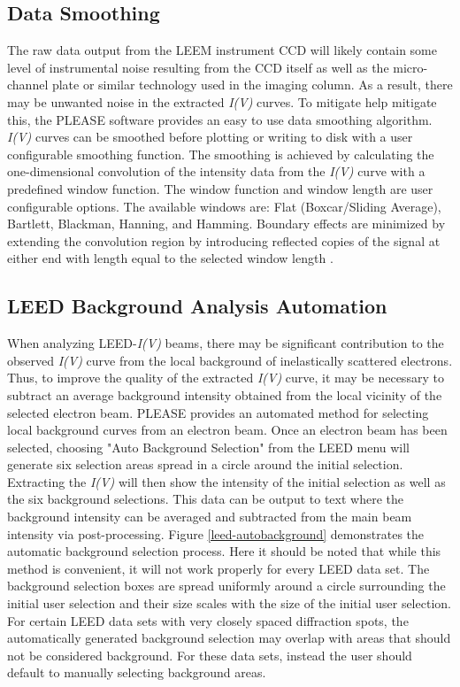 \subsection{Data Smoothing}
The raw data output from the LEEM instrument CCD will likely contain some level of instrumental noise resulting from the CCD itself as well as the micro-channel plate or similar technology used in the imaging column. As a result, there may be unwanted noise in the extracted \textit{I(V)} curves. To mitigate help mitigate this, the PLEASE software provides an easy to use data smoothing algorithm. \textit{I(V)} curves can be smoothed before plotting or writing to disk with a user configurable smoothing function. The smoothing is achieved by calculating the one-dimensional convolution of the intensity data from the \textit{I(V)} curve with a predefined window function. The window function and window length are user configurable options. The available windows are: Flat (Boxcar/Sliding Average), Bartlett, Blackman, Hanning, and Hamming. Boundary effects are minimized by extending the convolution region by introducing reflected copies of the signal at either end with length equal to the selected window length \cite{scipy-cookbook}.

\subsection{LEED Background Analysis Automation}
When analyzing LEED-\textit{I(V)} beams, there may be significant contribution to the observed \textit{I(V)} curve from the local background of inelastically scattered electrons. Thus, to improve the quality of the extracted \textit{I(V)} curve, it may be necessary to subtract an average background intensity obtained from the local vicinity of the selected electron beam. PLEASE provides an automated method for selecting local background curves from an electron beam. Once an electron beam has been selected, choosing "Auto Background Selection" from the LEED menu will generate six selection areas spread in a circle around the initial selection. Extracting the \textit{I(V)} will then show the intensity of the initial selection as well as the six background selections. This data can be output to text where the background intensity can be averaged and subtracted from the main beam intensity via post-processing. Figure \ref{leed-autobackground} demonstrates the automatic background selection process. Here it should be noted that while this method is convenient, it will not work properly for every LEED data set. The background selection boxes are  spread uniformly around a circle surrounding the initial user selection and their size scales with the size of the initial user selection. For certain LEED data sets with very closely spaced diffraction spots, the automatically generated background selection may overlap with areas that should not be considered background. For these data sets, instead the user should default to manually selecting background areas.

